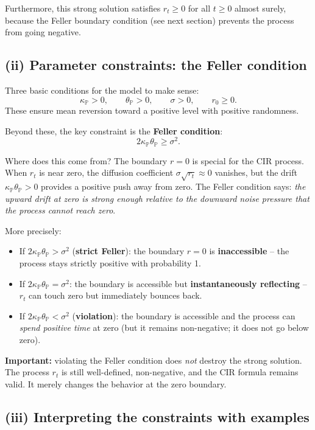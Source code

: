 \documentclass[11pt]{article}
\newcommand{\PP}{\mathbb{P}}
\begin{document}
Furthermore, this strong solution satisfies $r_t \ge 0$ for all $t \ge 0$
almost surely, because the Feller boundary condition (see next section)
prevents the process from going negative.

\subsection{(ii) Parameter constraints: the Feller condition}

Three basic conditions for the model to make sense:
\[
\kappa_\PP > 0, \qquad \theta_\PP > 0, \qquad \sigma > 0, \qquad r_0 \ge 0.
\]
These ensure mean reversion toward a positive level with positive
randomness.

Beyond these, the key constraint is the \textbf{Feller condition}:
\[
2\kappa_\PP\theta_\PP \ge \sigma^2.
\]

Where does this come from?  The boundary $r=0$ is special for the CIR
process.  When $r_t$ is near zero, the diffusion coefficient $\sigma\sqrt{r_t}
\approx 0$ vanishes, but the drift $\kappa_\PP\theta_\PP > 0$ provides a
positive push away from zero.  The Feller condition says: \emph{the
upward drift at zero is strong enough relative to the downward noise
pressure that the process cannot reach zero}.

More precisely:
\begin{itemize}
  \item If $2\kappa_\PP\theta_\PP > \sigma^2$ (\textbf{strict Feller}): the
  boundary $r=0$ is \textbf{inaccessible} -- the process stays strictly
  positive with probability 1.
  \item If $2\kappa_\PP\theta_\PP = \sigma^2$: the boundary is accessible
  but \textbf{instantaneously reflecting} -- $r_t$ can touch zero but
  immediately bounces back.
  \item If $2\kappa_\PP\theta_\PP < \sigma^2$ (\textbf{violation}): the
  boundary is accessible and the process can \emph{spend positive time}
  at zero (but it remains non-negative; it does not go below zero).
\end{itemize}

\textbf{Important:} violating the Feller condition does \emph{not} destroy
the strong solution.  The process $r_t$ is still well-defined,
non-negative, and the CIR formula remains valid.  It merely changes the
behavior at the zero boundary.

\subsection{(iii) Interpreting the constraints with examples}
\end{document}
